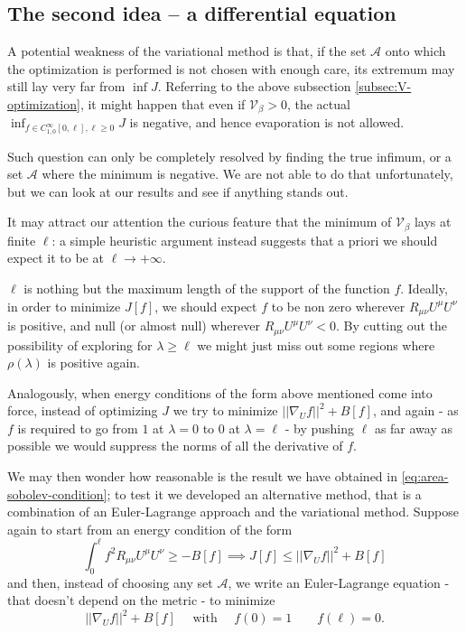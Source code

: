 \subsection{The second idea -- a differential equation}
\label{subsec:E-L-optimization}
A potential weakness of the variational method is that, if the set \(\mathcal{A}\) onto which the optimization is performed is not chosen with enough care, its extremum may still lay very far from \(\inf J\). Referring to the above subsection \ref{subsec:V-optimization}, it might happen that even if \(\mathcal{V}_{\beta} > 0\), the actual \(\inf_{f\in C^{\infty}_{1,0}[0, \ell], \ell \ge 0}J\) is negative, and hence evaporation is not allowed.

Such question can only be completely resolved by finding the true infimum, or a set \(\mathcal{A}\) where the minimum is negative. We are not able to do that unfortunately, but we can look at our results and see if anything stands out. 

It may attract our attention the curious feature that the minimum of \(\mathcal{V}_{\beta}\) lays at finite \(\ell\): a simple heuristic argument instead suggests that a priori we should expect it to be at \(\ell \rightarrow +\infty\).

\(\ell\) is nothing but the maximum length of the support of the function \(f\). Ideally, in order to minimize \(J[f]\), we should expect \(f\) to be non zero wherever \(R_{\mu\nu}U^{\mu}U^{\nu}\) is positive, and null (or almost null) wherever \(R_{\mu\nu}U^{\mu}U^{\nu} < 0\). By cutting out the possibility of exploring for \(\lambda \ge \ell\) we might just miss out some regions where \(\rho(\lambda)\) is positive again. 

\noindent
Analogously, when energy conditions of the form above mentioned come into force, instead of optimizing \(J\) we try to minimize \(\vert\vert \nabla_U f\vert\vert^2 + B[f]\), and again - as \(f\) is required to go from \(1\) at \(\lambda = 0\) to \(0\) at \(\lambda = \ell\) - by pushing \(\ell\) as far away as possible we would suppress the norms of all the derivative of \(f\).

We may then wonder how reasonable is the result we have obtained in \eqref{eq:area-sobolev-condition}; to test it we developed an alternative method, that is a combination of an Euler-Lagrange approach and the variational method. Suppose again to start from an energy condition of the form
	\[
		\int_0^{\ell} f^2 R_{\mu\nu}U^{\mu}U^{\nu} \ge -B[f] \implies J[f] \le \vert\vert \nabla_U f\vert\vert^2 + B[f]
	\]
and then, instead of choosing any set \(\mathcal{A}\), we write an Euler-Lagrange equation - that doesn't depend on the metric - to minimize 
	\[
	\vert\vert \nabla_U f\vert\vert^2 + B[f] \quad\text{ with }\quad f(0) = 1 \quad \quad f(\ell) = 0.	
	\]

